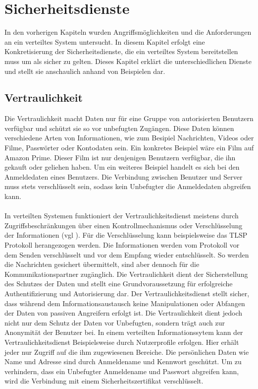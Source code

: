 \documentclass[utf8,biblatex]{lni}
\begin{document}
\section{Sicherheitsdienste}\label{Sicherheitsdienste}

In den vorherigen Kapiteln wurden Angriffsmöglichkeiten und die Anforderungen an ein verteiltes System untersucht. In diesem Kapitel erfolgt eine Konkretisierung der Sicherheitsdienste, die
ein verteiltes System bereitstellen muss um als sicher zu gelten. Dieses Kapitel erklärt die unterschiedlichen Dienste und stellt sie anschaulich anhand von Beispielen dar.

\subsection{Vertraulichkeit}
Die Vertraulichkeit macht Daten nur für eine Gruppe von autorisierten Benutzern verfügbar und schützt sie so vor unbefugten Zugängen. Diese Daten können verschiedene Arten von Informationen,
wie zum Besipiel Nachrichten, Videos oder Filme, Passwörter oder Kontodaten sein. Ein konkretes Beispiel wäre ein Film auf Amazon Prime. Dieser Film ist nur denjenigen
Benutzern verfügbar, die ihn gekauft oder geliehen haben. Um ein weiteres Beispiel handelt es sich bei den Anmeldedaten eines Benutzers. Die Verbindung zwischen Benutzer
und Server muss stets verschlüsselt sein, sodass kein Unbefugter die Anmeldedaten abgreifen kann. \citet{Kriha.2008}
\\\\
In verteilten Systemen funktioniert der Vertraulichkeitsdienst meistens durch Zugriffsbeschränkungen über einen Kontrollmechanismus oder Verschlüsselung der Informationen (vgl \citet{Mirhakkak.1993}).
Für die Verschlüsselung kann beispielsweise das TLSP Protokoll herangezogen werden. Die Informationen werden vom Protokoll vor dem Senden verschlüsselt und vor dem Empfang wieder entschlüsselt.
So werden die Nachrichten gesichert übermittelt, sind aber dennoch für die Kommunikationspartner zugänglich. Die Vertraulichkeit dient der Sicherstellung des Schutzes der Daten und stellt eine Grundvoraussetzung für erfolgreiche Authentifizierung
und Autorisierung dar. Der Vertraulichkeitsdienst stellt sicher, dass während dem Informationsaustausch keine Manipulationen oder Abfangen der Daten von passiven Angreifern erfolgt ist. \citet{Mirhakkak.1993}
Die Vertraulichkeit dient jedoch nicht nur dem Schutz der Daten vor Unbefugten, sondern trägt auch zur Anonymität der Benutzer bei.
In einem verteilten Informationssytem kann der Vertraulichkeitsdienst Beispielsweise durch Nutzerprofile erfolgen. Hier erhält jeder nur Zugriff auf die ihm zugewiesenen Bereiche. Die persönlichen Daten wie Name und
Adresse sind durch Anmeldename und Kennwort geschützt. Um zu verhindern, dass ein Unbefugter Anmeldename und Passwort abgreifen kann, wird die Verbindung mit einem Sicherheitszertifikat verschlüsselt.
\end{document}
